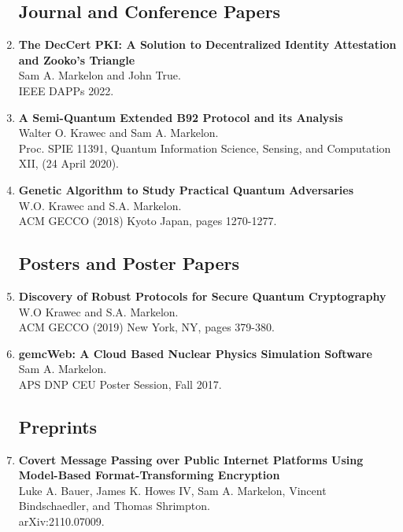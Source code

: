 \documentclass[10pt]{article}
\begin{document}
\begin{enumerate}
  
\subsection*{Journal and Conference Papers}

\item {\bf The DecCert PKI: A Solution to Decentralized Identity Attestation and Zooko's Triangle}\\
Sam A. Markelon and John True.\\
IEEE DAPPs 2022.

\item {\bf A Semi-Quantum Extended B92 Protocol and its Analysis}\\
Walter O. Krawec and Sam A. Markelon. \\
Proc. SPIE 11391, Quantum Information Science, Sensing, and Computation XII, (24 April 2020).


\item {\bf Genetic Algorithm to Study Practical Quantum Adversaries}\\
  W.O. Krawec and S.A. Markelon.\\
  ACM GECCO (2018) Kyoto Japan, pages 1270-1277.

\subsection*{Posters and Poster Papers}

\item {\bf Discovery of Robust Protocols for Secure Quantum Cryptography}\\
  W.O Krawec and S.A. Markelon.\\
  ACM GECCO (2019) New York, NY, pages 379-380.

\item {\bf gemcWeb: A Cloud Based Nuclear Physics Simulation Software}\\
  Sam A. Markelon.\\
  APS DNP CEU Poster Session, Fall 2017.

\subsection*{Preprints}

\item {\bf Covert Message Passing over Public Internet Platforms Using Model-Based Format-Transforming Encryption}\\
  Luke A. Bauer, James K. Howes IV, Sam A. Markelon, Vincent Bindschaedler, and Thomas Shrimpton.\\
  arXiv:2110.07009.

\end{enumerate}
\end{document}
